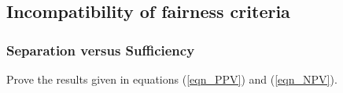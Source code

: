 \subsection{Incompatibility of fairness criteria}

\subsubsection{Separation versus Sufficiency}

\begin{lookbox}
Prove the results given in equations (\ref{eqn_PPV}) and (\ref{eqn_NPV}).
\end{lookbox}

